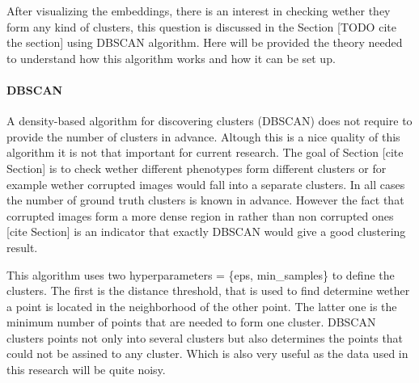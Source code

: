 After visualizing the embeddings, there is an interest in checking wether they form any kind of clusters, this question is discussed in the Section [TODO cite the section] using DBSCAN algorithm. Here will be provided the theory needed to understand how this algorithm works and how it can be set up.
\paragraph{DBSCAN}
A density-based algorithm for discovering clusters (DBSCAN) does not require to provide the number of clusters in advance. Altough this is a nice quality of this algorithm it is not that important for current research. The goal of Section [cite Section] is to check wether different phenotypes form different clusters or for example wether corrupted images would fall into a separate clusters. In all cases the number of ground truth clusters is known in advance. However the fact that corrupted images form a more dense region in rather than non corrupted ones [cite Section] is an indicator that exactly DBSCAN would give a good clustering result. 

This algorithm uses two hyperparameters = \{eps, min\_samples\} to define the clusters. The first is the distance threshold, that is used to find determine wether a point is located in the neighborhood of the other point. The latter one is the minimum number of points that are needed to form one cluster. DBSCAN clusters points not only into several clusters but also determines the points that could not be assined to any cluster. Which is also very useful as the data used in this research will be quite noisy.